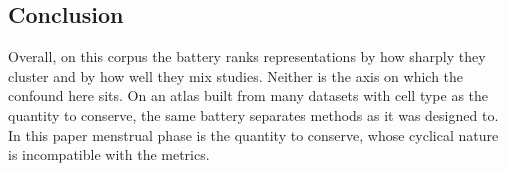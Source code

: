 \subsection{Conclusion}

Overall, on this corpus the battery ranks representations by how sharply
they cluster and by how well they mix studies. Neither is the axis on
which the confound here sits. On an atlas built from many datasets with
cell type as the quantity to conserve, the same battery separates methods
as it was designed to. In this paper menstrual phase is the quantity to 
conserve, whose cyclical nature is incompatible with the metrics.
